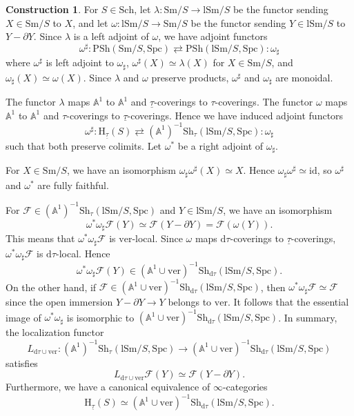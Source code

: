 \documentclass[10pt]{amsart}
\theoremstyle{definition}
\newtheorem{const}[thm]{Construction}
\theoremstyle{remark}
\numberwithin{equation}{subsection}
\newcommand{\A}{\mathbb{A}}
\newcommand{\cF}{\mathcal{F}}
\newcommand{\rH}{\mathrm{H}}
\newcommand{\id}{\mathrm{id}}
\newcommand{\ul}{\underline}
\newcommand{\Sm}{\mathrm{Sm}}
\newcommand{\Sch}{\mathrm{Sch}}
\newcommand{\lSm}{\mathrm{lSm}}
\newcommand{\infPsh}{\mathrm{PSh}}
\newcommand{\infShv}{\mathrm{Sh}}
\newcommand{\Spc}{\mathrm{Spc}}
\newcommand{\ver}{\mathrm{ver}}
\newcommand{\dtau}{\mathrm{d}\tau}
\begin{document}
\begin{const}
\label{comp.5}
For $S\in \Sch$,
let $\lambda\colon \Sm/S\to \lSm/S$ be the functor sending $X\in \Sm/S$ to $X$, and let $\omega\colon \lSm/S\to \Sm/S$ be the functor sending $Y\in \lSm/S$ to $Y-\partial Y$.
Since $\lambda$ is a left adjoint of $\omega$, we have adjoint functors
\begin{equation}
\omega^\sharp
:
\infPsh(\Sm/S,\Spc)
\rightleftarrows
\infPsh(\lSm/S,\Spc)
:
\omega_\sharp
\end{equation}
where $\omega^\sharp$ is left adjoint to $\omega_\sharp$, $\omega^\sharp (X)\simeq \lambda(X)$ for $X\in \Sm/S$, and $\omega_\sharp (X)\simeq \omega(X)$.
Since $\lambda$ and $\omega$ preserve products, $\omega^\sharp$ and $\omega_\sharp$ are monoidal.

The functor $\lambda$ maps $\A^1$ to $\A^1$ and $\ul{\tau}$-coverings to $\tau$-coverings.
The functor $\omega$ maps $\A^1$ to $\A^1$ and $\tau$-coverings to $\ul{\tau}$-coverings.
Hence we have induced adjoint functors
\begin{equation}
\label{comp.5.1}
\omega^\sharp
:
\rH_{\ul{\tau}}(S)
\rightleftarrows
(\A^1)^{-1}\infShv_\tau(\lSm/S,\Spc)
:
\omega_\sharp
\end{equation}
such that both preserve colimits.
Let $\omega^*$ be a right adjoint of $\omega_\sharp$.

For $X\in \Sm/S$, we have an isomorphism $\omega_\sharp \omega^\sharp (X) \simeq X$.
Hence $\omega_\sharp \omega^\sharp \simeq \id$, so $\omega^\sharp$ and $\omega^*$ are fully faithful.

For $\cF\in (\A^1)^{-1}\infShv_\tau(\lSm/S,\Spc)$ and $Y\in \lSm/S$, we have an isomorphism
\[
\omega^*\omega_\sharp \cF(Y)
\simeq
\cF(Y-\partial Y)=\cF(\omega(Y)).
\]
This means that $\omega^*\omega_\sharp \cF$ is $\ver$-local.
Since $\omega$ maps $\dtau$-coverings to $\ul{\tau}$-coverings, $\omega^*\omega_\sharp \cF$ is $\dtau$-local.
Hence
\[
\omega^*\omega_\sharp \cF(Y)\in (\A^1\cup \ver)^{-1}\infShv_{\dtau}(\lSm/S,\Spc).
\]
On the other hand, if $\cF\in (\A^1\cup \ver)^{-1}\infShv_{\dtau}(\lSm/S,\Spc)$, then $\omega^*\omega_\sharp \cF\simeq \cF$ since the open immersion $Y-\partial Y\to Y$ belongs to $\ver$.
It follows that the essential image of $\omega^*\omega_\sharp$ is isomorphic to $(\A^1\cup \ver)^{-1}\infShv_{\dtau}(\lSm/S,\Spc)$.
In summary, the localization functor
\[
L_{\dtau\cup \ver}
\colon
(\A^1)^{-1}\infShv_{\tau}(\lSm/S,\Spc)
\to
(\A^1\cup \ver)^{-1}\infShv_{\dtau}(\lSm/S,\Spc)
\]
satisfies
\begin{equation}
\label{comp.5.2}
L_{\dtau\cup \ver}\cF(Y)
\simeq
\cF(Y-\partial Y).
\end{equation}
Furthermore, we have a canonical equivalence of $\infty$-categories
\begin{equation}
\label{comp.5.3}
\rH_{\ul{\tau}}(S)
\simeq
(\A^1\cup \ver)^{-1}\infShv_{\dtau}(\lSm/S,\Spc).
\end{equation}
\end{const}
\end{document}
